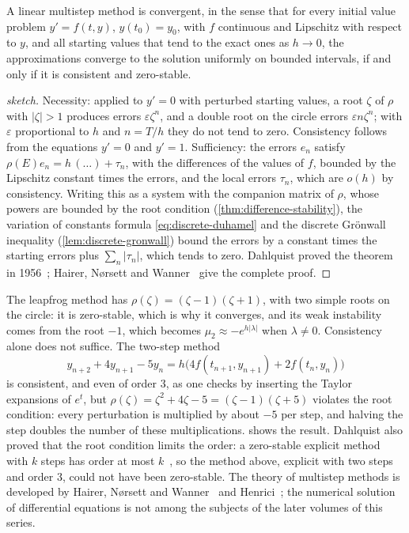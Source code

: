 \begin{theorem}
\label{thm:dahlquist}
A linear multistep method is convergent, in the sense that for every initial value problem $y'=f(t,y)$, $y(t_0)=y_0$, with $f$ continuous and Lipschitz with respect to $y$, and all starting values that tend to the exact ones as $h\to0$, the approximations converge to the solution uniformly on bounded intervals, if and only if it is consistent and zero-stable.
\end{theorem}

\begin{proof}[sketch]
Necessity: applied to $y'=0$ with perturbed starting values, a root $\zeta$ of $\rho$ with $|\zeta|>1$ produces errors $\varepsilon\zeta^n$, and a double root on the circle errors $\varepsilon n\zeta^n$; with $\varepsilon$ proportional to $h$ and $n=T/h$ they do not tend to zero. Consistency follows from the equations $y'=0$ and $y'=1$. Sufficiency: the errors $e_n$ satisfy $\rho(E)e_n=h\,(\ldots)+\tau_n$, with the differences of the values of $f$, bounded by the Lipschitz constant times the errors, and the local errors $\tau_n$, which are $o(h)$ by consistency. Writing this as a system with the companion matrix of $\rho$, whose powers are bounded by the root condition (\cref{thm:difference-stability}), the variation of constants formula \eqref{eq:discrete-duhamel} and the discrete Gr\"onwall inequality (\cref{lem:discrete-gronwall}) bound the errors by a constant times the starting errors plus $\sum_n|\tau_n|$, which tends to zero. Dahlquist proved the theorem in 1956~\cite{dahlquist1956}; Hairer, N{\o}rsett and Wanner~\cite[Chap.~III]{hairer1993} give the complete proof.
\end{proof}

The leapfrog method has $\rho(\zeta)=(\zeta-1)(\zeta+1)$, with two simple roots on the circle: it is zero-stable, which is why it converges, and its weak instability comes from the root $-1$, which becomes $\mu_2\approx-e^{h|\lambda|}$ when $\lambda\ne0$. Consistency alone does not suffice. The two-step method
\[
y_{n+2}+4y_{n+1}-5y_n=h\bigl(4f(t_{n+1},y_{n+1})+2f(t_n,y_n)\bigr)
\]
is consistent, and even of order $3$, as one checks by inserting the Taylor expansions of $e^t$, but $\rho(\zeta)=\zeta^2+4\zeta-5=(\zeta-1)(\zeta+5)$ violates the root condition: every perturbation is multiplied by about $-5$ per step, and halving the step doubles the number of these multiplications.  shows the result. Dahlquist also proved that the root condition limits the order: a zero-stable explicit method with $k$ steps has order at most $k$~\cite[Chap.~III]{hairer1993}, so the method above, explicit with two steps and order $3$, could not have been zero-stable. The theory of multistep methods is developed by Hairer, N{\o}rsett and Wanner~\cite{hairer1993} and Henrici~\cite{henrici1962discrete}; the numerical solution of differential equations is not among the subjects of the later volumes of this series.

